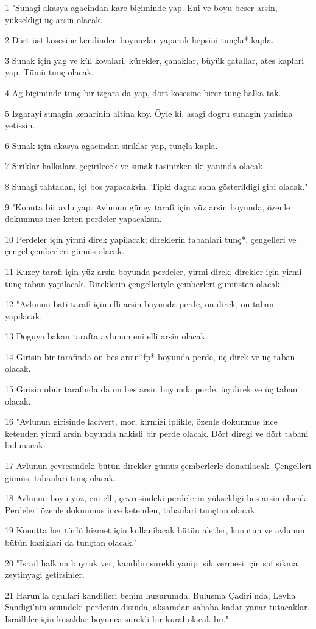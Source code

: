\par 1 "Sunagi akasya agacindan kare biçiminde yap. Eni ve boyu beser arsin, yüksekligi üç arsin olacak.
\par 2 Dört üst kösesine kendinden boynuzlar yaparak hepsini tunçla* kapla.
\par 3 Sunak için yag ve kül kovalari, kürekler, çanaklar, büyük çatallar, ates kaplari yap. Tümü tunç olacak.
\par 4 Ag biçiminde tunç bir izgara da yap, dört kösesine birer tunç halka tak.
\par 5 Izgarayi sunagin kenarinin altina koy. Öyle ki, asagi dogru sunagin yarisina yetissin.
\par 6 Sunak için akasya agacindan siriklar yap, tunçla kapla.
\par 7 Siriklar halkalara geçirilecek ve sunak tasinirken iki yaninda olacak.
\par 8 Sunagi tahtadan, içi bos yapacaksin. Tipki dagda sana gösterildigi gibi olacak."
\par 9 "Konuta bir avlu yap. Avlunun güney tarafi için yüz arsin boyunda, özenle dokunmus ince keten perdeler yapacaksin.
\par 10 Perdeler için yirmi direk yapilacak; direklerin tabanlari tunç*, çengelleri ve çengel çemberleri gümüs olacak.
\par 11 Kuzey tarafi için yüz arsin boyunda perdeler, yirmi direk, direkler için yirmi tunç taban yapilacak. Direklerin çengelleriyle çemberleri gümüsten olacak.
\par 12 "Avlunun bati tarafi için elli arsin boyunda perde, on direk, on taban yapilacak.
\par 13 Doguya bakan tarafta avlunun eni elli arsin olacak.
\par 14 Girisin bir tarafinda on bes arsin*fp* boyunda perde, üç direk ve üç taban olacak.
\par 15 Girisin öbür tarafinda da on bes arsin boyunda perde, üç direk ve üç taban olacak.
\par 16 "Avlunun girisinde lacivert, mor, kirmizi iplikle, özenle dokunmus ince ketenden yirmi arsin boyunda nakisli bir perde olacak. Dört diregi ve dört tabani bulunacak.
\par 17 Avlunun çevresindeki bütün direkler gümüs çemberlerle donatilacak. Çengelleri gümüs, tabanlari tunç olacak.
\par 18 Avlunun boyu yüz, eni elli, çevresindeki perdelerin yüksekligi bes arsin olacak. Perdeleri özenle dokunmus ince ketenden, tabanlari tunçtan olacak.
\par 19 Konutta her türlü hizmet için kullanilacak bütün aletler, konutun ve avlunun bütün kaziklari da tunçtan olacak."
\par 20 "Israil halkina buyruk ver, kandilin sürekli yanip isik vermesi için saf sikma zeytinyagi getirsinler.
\par 21 Harun'la ogullari kandilleri benim huzurumda, Bulusma Çadiri'nda, Levha Sandigi'nin önündeki perdenin disinda, aksamdan sabaha kadar yanar tutacaklar. Israilliler için kusaklar boyunca sürekli bir kural olacak bu."

